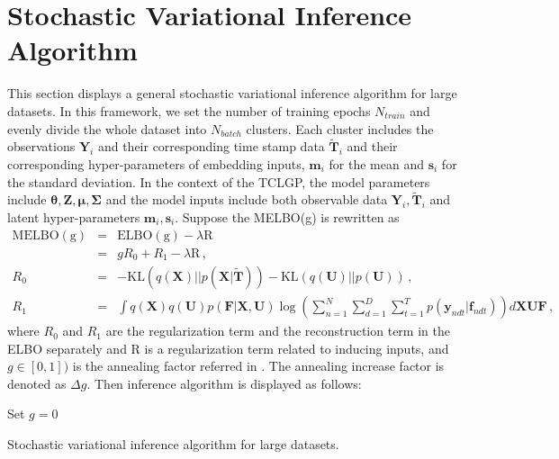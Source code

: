 \section{Stochastic Variational Inference Algorithm}
\label{sec: scia}
This section displays a general stochastic variational inference algorithm for large datasets. In this framework, we set the number of training epochs $N_{train}$ and evenly divide the whole dataset into $N_{batch}$ clusters. Each cluster includes the observations $\bm Y_i$ and their corresponding time stamp data $\tilde{\bm T}_i$ and their corresponding hyper-parameters of embedding inputs, $\bm m_i$ for the mean and $\bm s_i$ for the standard deviation. In the context of the TCLGP, the model parameters include $\bm \theta, \bm Z, \bm \mu, \bm \Sigma$ and the model inputs include both observable data $\bm Y_i, \tilde{\bm T}_i$ and latent hyper-parameters $\bm m_i, \bm s_i$. Suppose the MELBO(g) is rewritten as
\begin{eqnarray}
\mathrm{MELBO(g)} & = & \mathrm{ELBO(g)} - \lambda\mathrm{R} \nonumber \\
& = & gR_0 + R_1 - \lambda\mathrm{R}\,, \nonumber \\
R_0 & = & -\mathrm{KL}(q(\bm X) || p(\bm X | \tilde{\bm T})) - \mathrm{KL}(q(\bm U) || p(\bm U)) \,, \nonumber \\
R_1 & = & \int q(\bm X) q(\bm  U) p(\bm F | \bm X, \bm U) \log\left(\sum_{n = 1}^{N}\sum_{d = 1}^{D}\sum_{t = 1}^{T} p(\bm y_{ndt} | \bm f_{ndt})\right)d\bm X \bm U \bm F \,, \nonumber
\end{eqnarray}
where $R_0$ and $R_1$ are the regularization term and the reconstruction term 
in the ELBO separately and $\mathrm{R}$ is a regularization term related to inducing inputs, and $g\in[0,1])$ is the annealing factor referred in \cite{Bowman_2015}. The annealing increase factor is denoted as $\Delta g$. Then inference algorithm is displayed as follows: 

\begin{algorithm}[H]
	\SetAlgoLined
	Set $g = 0$\;
	\caption{Stochastic variational inference algorithm for large datasets.}
\end{algorithm}




